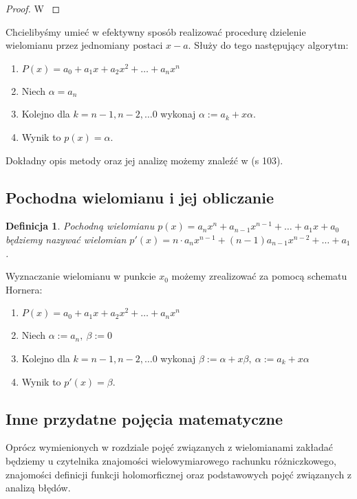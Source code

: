 \documentclass{article}
\newtheorem{definicja}{Definicja}
\begin{document}
\begin{proof}
W \cite{kostrikin}	
\end{proof}

Chcielibyśmy umieć w efektywny sposób realizować procedurę dzielenie wielomianu przez jednomiany postaci $x-a$. Służy do tego następujący algorytm:

\begin{enumerate}
\item $P(x) = a_0 + a_1 x + a_2 x^2 + \ldots + a_n x^n$
\item Niech $\alpha = a_n$
\item Kolejno dla $k = n-1, n-2, \ldots 0$ wykonaj $\alpha := a_k + x \alpha$.
\item Wynik to $p(x) = \alpha$.
\end{enumerate}

Dokładny opis metody oraz jej analizę możemy znaleźć w \cite{kincaid} (s 103).\\

\subsection{Pochodna wielomianu i jej obliczanie}

\begin{definicja}
Pochodną wielomianu $p(x) = a_nx^n + a_{n-1}x^{n-1} + \ldots + a_1x + a_0$ będziemy nazywać wielomian $p'(x) = 	n \cdot a_n x^{n-1} + (n-1) a_{n-1}x^{n-2} + \ldots +  a_1$.
\end{definicja}

Wyznaczanie wielomianu w punkcie $x_0$ możemy zrealizować za pomocą schematu Hornera:

\begin{enumerate}
\item $P(x) = a_0 + a_1 x + a_2 x^2 + \ldots + a_n x^n$
\item Niech $\alpha := a_n, \ \beta := 0$
\item Kolejno dla $k = n-1, n-2, \ldots 0$ wykonaj $\beta := \alpha + x \beta, \ \alpha := a_k + x \alpha$

\item Wynik to $p'(x) = \beta$.
\end{enumerate}

\subsection{Inne przydatne pojęcia matematyczne}

Oprócz wymienionych w rozdziale pojęć związanych z wielomianami zakładać będziemy u czytelnika znajomości wielowymiarowego rachunku różniczkowego, znajomości definicji funkcji holomorficznej oraz podstawowych pojęć związanych z analizą błędów. 
\end{document}
